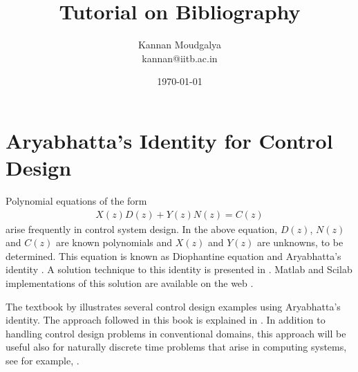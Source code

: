 \documentclass[12pt]{article}
\title{Tutorial on Bibliography}
\author{Kannan Moudgalya \\ kannan@iitb.ac.in \\ \byncsa}
\date{\today}
\begin{document}
\maketitle
\newpage
\section{Aryabhatta's Identity for Control Design}

Polynomial equations of the form
\begin{align*}
X(z)D(z) + Y(z)N(z) = C(z)
\end{align*}
arise frequently in control system design.  In the above equation,
$D(z)$, $N(z)$ and $C(z)$ are known polynomials and $X(z)$ and 
$Y(z)$ are unknowns, to be determined.  This equation is known as 
Diophantine equation \cite{vk79,tk80} and Aryabhatta's identity
\cite{mv85}.  A solution technique to this identity is presented in
\cite{cp82}.  Matlab and Scilab implementations of this solution are
available on the web \cite{kmm1-07}.

The textbook by \cite{kmm07} 
illustrates several control design
examples using Aryabhatta's identity.  The approach followed in this
book is explained in \cite{ms04,km06}.  In addition to handling
control design problems in conventional domains, this approach will 
be useful also for naturally discrete time problems that arise in
computing systems, see for example, \cite{mmr03,mrbm04,vs06}.



\end{document}
